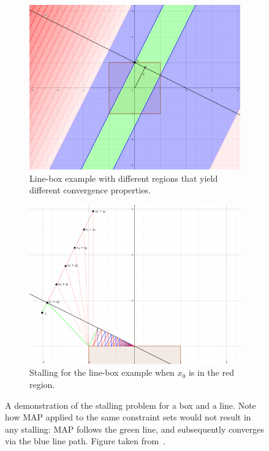 \documentclass[hidelinks]{article}
\begin{document}
\begin{figure}[h]
    \centering
    \begin{subfigure}[t]{0.49\textwidth}
        \centering
        \includegraphics[width=1\textwidth]{Latex/Current Version/Figures/StallingRegionsHand.png}
        \caption{Line-box example with different regions that yield different convergence properties.}
        \label{fig:region}
    \end{subfigure}
    \hfill
    \begin{subfigure}[t]{0.49\textwidth}
        \centering
        \includegraphics[width=1\textwidth]{Latex/Current Version/Figures/DifferentSequences.png}
        \caption{Stalling for the line-box example when $x_0$ is in the red region.}
        \label{fig:stalling}
    \end{subfigure}
    \caption{A demonstration of the stalling problem for a box and a line. Note how MAP applied to the same constraint sets would not result in any stalling: MAP follows the green line, and subsequently converges via the blue line path. Figure taken from~\cite{DYKSTRASTALLING}.}
    \label{fig:baushkeStall}
\end{figure}
\end{document}
